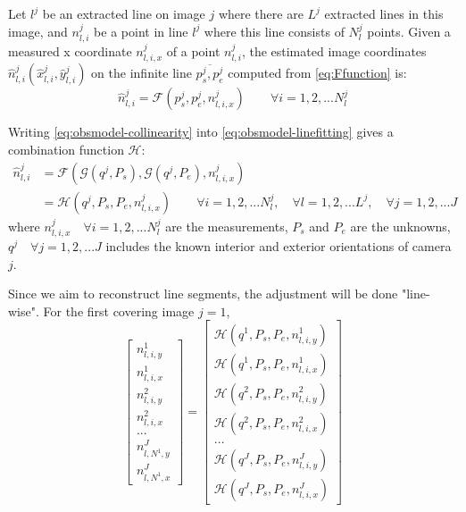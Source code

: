 Let $l^j$ be an extracted line on image $j$ where there are $L^j$ extracted lines in this image, and $n^j_{l,i}$ be a point in line $l^j$ where this line consists of $N^j_l$ points. Given a measured x coordinate $n^j_{l,i,x}$ of a point $n^j_{l,i}$, the estimated image coordinates $\hat{n}^j_{l,i}(\hat{x}^j_{l,i},\hat{y}^j_{l,i})$ on the infinite line $\overline{p^j_s,p^j_e}$ computed from \cref{eq:Ffunction} is:
\begin{equation} \label{eq:obsmodel-linefitting}
\hat{n}^j_{l,i} = \mathcal{F}(p^j_s,p^j_e,n^j_{l,i,x})
\qquad
\forall i=1,2,...N^j_l
\end{equation}

Writing \eqref{eq:obsmodel-collinearity} into \eqref{eq:obsmodel-linefitting} gives a combination function $\mathcal{H}$:
\begin{equation} \label{eq:obsmodel}
\begin{split}
\hat{n}^j_{l,i} &= \mathcal{F}(\mathcal{G}(q^j,P_s),\mathcal{G}(q^j,P_e),n^j_{l,i,x})\\
&=\mathcal{H}(q^j,P_s,P_e,n^j_{l,i,x})
\qquad
\forall i=1,2,...N^j_l,\quad\forall l=1,2,...L^j,\quad\forall j=1,2,...J
\end{split}
\end{equation}
where $n^j_{l,i,x}\quad\forall i=1,2,...N^j_l$ are the measurements, $P_s$ and $P_e$ are the unknowns, $q^j\quad\forall j=1,2,...J$ includes the known interior and exterior orientations of camera $j$.\newline

\clearpage
Since we aim to reconstruct line segments, the adjustment will be done "line-wise". 
For the first covering image $j=1$, 
\begin{equation}
\begin{bmatrix}
n^1_{l,i,y}\\[0.3em]
n^1_{l,i,x}\\[0.3em]
n^2_{l,i,y}\\[0.3em]
n^2_{l,i,x}\\[0.3em]
...\\[0.3em]
n^J_{l,N^1,y}\\[0.3em]
n^J_{l,N^1,x}
\end{bmatrix}
=
\begin{bmatrix}
\mathcal{H}(q^1,P_s,P_e,n^1_{l,i,y})\\[0.3em]
\mathcal{H}(q^1,P_s,P_e,n^1_{l,i,x})\\[0.3em]
\mathcal{H}(q^2,P_s,P_e,n^2_{l,i,y})\\[0.3em]
\mathcal{H}(q^2,P_s,P_e,n^2_{l,i,x})\\[0.3em]
...\\[0.3em]
\mathcal{H}(q^J,P_s,P_e,n^J_{l,i,y})\\[0.3em]
\mathcal{H}(q^J,P_s,P_e,n^J_{l,i,x})
\end{bmatrix}
\end{equation}






